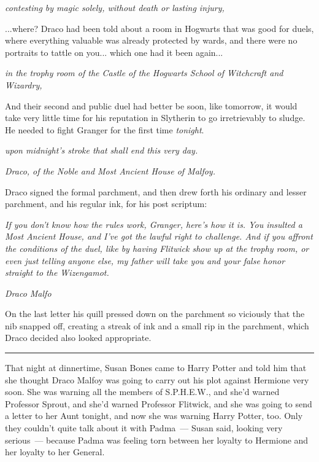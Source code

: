 \emph{contesting by magic solely, without death or lasting injury,}

...where? Draco had been told about a room in Hogwarts that was good for duels, where everything valuable was already protected by wards, and there were no portraits to tattle on you... which one had it been again...

\emph{in the trophy room of the Castle of the Hogwarts School of Witchcraft and Wizardry,}

And their second and public duel had better be soon, like tomorrow, it would take very little time for his reputation in Slytherin to go irretrievably to sludge. He needed to fight Granger for the first time \emph{tonight}.

\emph{upon midnight's stroke that shall end this very day.}

\emph{Draco, of the Noble and Most Ancient House of Malfoy.}

Draco signed the formal parchment, and then drew forth his ordinary and lesser parchment, and his regular ink, for his post scriptum:

\emph{If you don't know how the rules work, Granger, here's how it is. You insulted a Most Ancient House, and I've got the lawful right to challenge. And if you affront the conditions of the duel, like by having Flitwick show up at the trophy room, or even just telling anyone else, my father will take you and your false honor straight to the Wizengamot.}

\emph{Draco Malfo}

On the last letter his quill pressed down on the parchment so viciously that the nib snapped off, creating a streak of ink and a small rip in the parchment, which Draco decided also looked appropriate.

\begin{center}\rule{3in}{0.4pt}\end{center}

That night at dinnertime, Susan Bones came to Harry Potter and told him that she thought Draco Malfoy was going to carry out his plot against Hermione very soon. She was warning all the members of S.P.H.E.W., and she'd warned Professor Sprout, and she'd warned Professor Flitwick, and she was going to send a letter to her Aunt tonight, and now she was warning Harry Potter, too. Only they couldn't quite talk about it with Padma~--- Susan said, looking very serious~--- because Padma was feeling torn between her loyalty to Hermione and her loyalty to her General.

